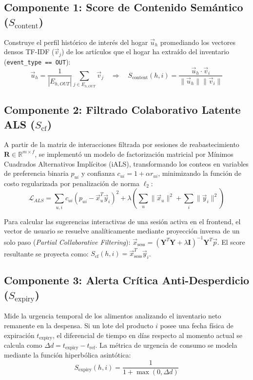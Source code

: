 \documentclass[11pt,a4paper]{article}
\begin{document}
\subsection{Componente 1: Score de Contenido Semántico ($S_{\text{content}}$)}
Construye el perfil histórico de interés del hogar $\vec{u}_h$ promediando los vectores densos TF-IDF ($\vec{v}_j$) de los artículos que el hogar ha extraído del inventario (\texttt{event\_type == OUT}):
\begin{equation}
\vec{u}_h = \frac{1}{|E_{h,OUT}|} \sum_{j \in E_{h,OUT}} \vec{v}_j \quad \Longrightarrow \quad S_{\text{content}}(h, i) = \frac{\vec{u}_h \cdot \vec{v}_i}{\lVert \vec{u}_h \rVert \lVert \vec{v}_i \rVert}
\end{equation}

\subsection{Componente 2: Filtrado Colaborativo Latente ALS ($S_{\text{cf}}$)}
A partir de la matriz de interacciones filtrada por sesiones de reabastecimiento $\mathbf{R} \in \mathbb{R}^{m \times f}$, se implementó un modelo de factorización matricial por Mínimos Cuadrados Alternativos Implícitos (iALS), transformando los conteos en variables de preferencia binaria $p_{ui}$ y confianza $c_{ui} = 1 + \alpha r_{ui}$, minimizando la función de costo regularizada por penalización de norma $\ell_2$:
\begin{equation}
\mathcal{L}_{ALS} = \sum_{u, i} c_{ui} (p_{ui} - \vec{x}_u^T \vec{y}_i)^2 + \lambda \left( \sum_u \lVert \vec{x}_u \rVert^2 + \sum_i \lVert \vec{y}_i \rVert^2 \right)
\end{equation}

Para calcular las sugerencias interactivas de una sesión activa en el frontend, el vector de usuario se resuelve analíticamente mediante proyección inversa de un solo paso (\textit{Partial Collaborative Filtering}): $\vec{x}_{\text{sess}} = \left( \mathbf{Y}^T \mathbf{Y} + \lambda \mathbf{I} \right)^{-1} \mathbf{Y}^T \vec{p}$. El score resultante se proyecta como: $S_{\text{cf}}(h, i) = \vec{x}_{\text{sess}}^T \vec{y}_i$.

\subsection{Componente 3: Alerta Crítica Anti-Desperdicio ($S_{\text{expiry}}$)}
Mide la urgencia temporal de los alimentos analizando el inventario neto remanente en la despensa. Si un lote del producto $i$ posee una fecha física de expiración $t_{\text{expiry}}$, el diferencial de tiempo en días respecto al momento actual se calcula como $\Delta d = t_{\text{expiry}} - t_{\text{ref}}$. La métrica de urgencia de consumo se modela mediante la función hiperbólica asintótica:
\begin{equation}
S_{\text{expiry}}(h, i) = \frac{1}{1 + \max(0, \Delta d)}
\end{equation}
\end{document}

